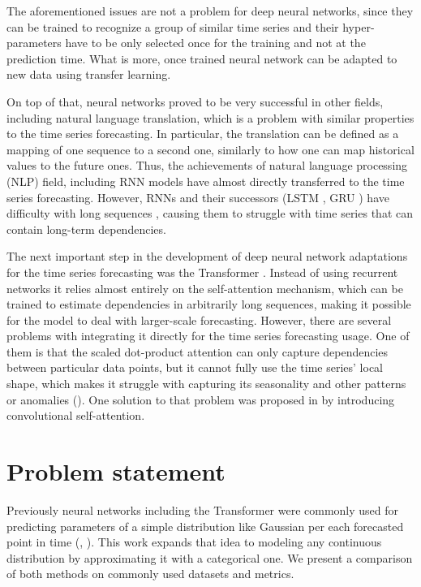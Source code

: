 \documentclass[en]{pracamgr}
\begin{document}
	
	The aforementioned issues are not a problem for deep neural networks, since they can be trained to recognize a group of similar time series and their hyper-parameters have to be only selected once for the training and not at the prediction time. What is more, once trained neural network can be adapted to new data using transfer learning. 
	
	On top of that, neural networks proved to be very successful in other fields, including natural language translation, which is a problem with similar properties to the time series forecasting. In particular, the translation can be defined as a mapping of one sequence to a second one, similarly to how one can map historical values to the future ones. Thus, the achievements of natural language processing (NLP) field, including RNN models have almost directly transferred to the time series forecasting. However, RNNs and their successors (LSTM \cite{lstm}, GRU \cite{gru}) have difficulty with long sequences \cite{context}, causing them to struggle with time series that can contain long-term dependencies.
	
	The next important step in the development of deep neural network adaptations for the time series forecasting was the Transformer \cite{tr}. Instead of using recurrent networks it relies almost entirely on the self-attention mechanism, which can be trained to estimate dependencies in arbitrarily long sequences, making it possible for the model to deal with larger-scale forecasting.
	However, there are several problems with integrating it directly for the time series forecasting usage. One of them is that the scaled dot-product attention can only capture dependencies between particular data points, but it cannot fully use the time series' local shape, which makes it struggle with capturing its seasonality and other patterns or anomalies (\cite{enhancing}).
	One solution to that problem was proposed in \cite{enhancing} by introducing convolutional self-attention.
	
	
	
	\section*{Problem statement}\label{r:problemst}
	
	Previously neural networks including the Transformer were commonly used for predicting parameters of a simple distribution like Gaussian per each forecasted point in time (\cite{deepar}, \cite{enhancing}). This work expands that idea to modeling any continuous distribution by approximating it with a categorical one. We present a comparison of both methods on commonly used datasets and metrics.
	
\end{document}
